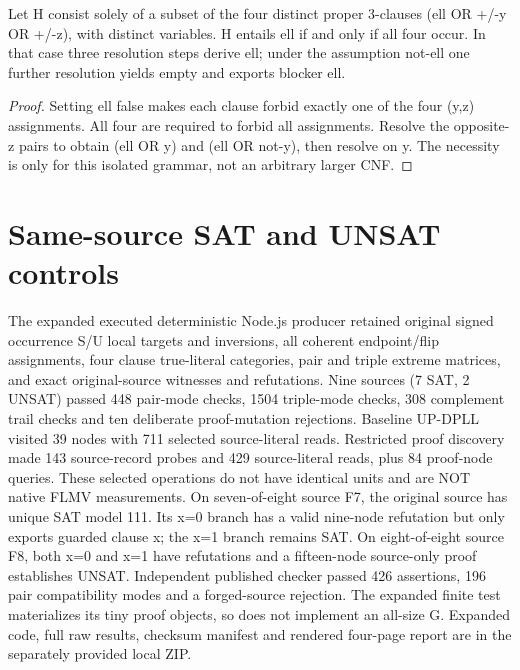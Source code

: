 \documentclass[11pt]{article}
\begin{document}
\begin{lemma}
Let H consist solely of a subset of the four distinct proper 3-clauses (ell OR +/-y OR +/-z), with distinct variables. H entails ell if and only if all four occur. In that case three resolution steps derive ell; under the assumption not-ell one further resolution yields empty and exports blocker ell.
\end{lemma}
\begin{proof}
Setting ell false makes each clause forbid exactly one of the four (y,z) assignments. All four are required to forbid all assignments. Resolve the opposite-z pairs to obtain (ell OR y) and (ell OR not-y), then resolve on y. The necessity is only for this isolated grammar, not an arbitrary larger CNF.
\end{proof}
\section{Same-source SAT and UNSAT controls}
The expanded executed deterministic Node.js producer retained original signed occurrence S/U local targets and inversions, all coherent endpoint/flip assignments, four clause true-literal categories, pair and triple extreme matrices, and exact original-source witnesses and refutations. Nine sources (7 SAT, 2 UNSAT) passed 448 pair-mode checks, 1504 triple-mode checks, 308 complement trail checks and ten deliberate proof-mutation rejections. Baseline UP-DPLL visited 39 nodes with 711 selected source-literal reads. Restricted proof discovery made 143 source-record probes and 429 source-literal reads, plus 84 proof-node queries. These selected operations do not have identical units and are NOT native FLMV measurements.
On seven-of-eight source F7, the original source has unique SAT model 111. Its x=0 branch has a valid nine-node refutation but only exports guarded clause x; the x=1 branch remains SAT. On eight-of-eight source F8, both x=0 and x=1 have refutations and a fifteen-node source-only proof establishes UNSAT. Independent published checker passed 426 assertions, 196 pair compatibility modes and a forged-source rejection. The expanded finite test materializes its tiny proof objects, so does not implement an all-size G. Expanded code, full raw results, checksum manifest and rendered four-page report are in the separately provided local ZIP.
\end{document}
